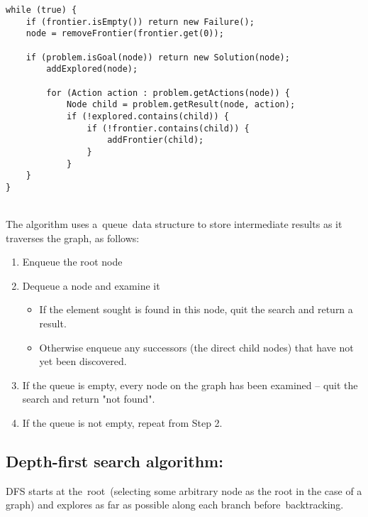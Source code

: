 \documentclass[a4paper]{article}
\begin{document}
\begin{lstlisting}
while (true) {
    if (frontier.isEmpty()) return new Failure();
    node = removeFrontier(frontier.get(0));

    if (problem.isGoal(node)) return new Solution(node);
        addExplored(node);

        for (Action action : problem.getActions(node)) {
            Node child = problem.getResult(node, action);
            if (!explored.contains(child)) {
                if (!frontier.contains(child)) {
                    addFrontier(child);
                }
            }
    }
}
\end{lstlisting}

\noindent \\
The algorithm uses a queue data structure to store intermediate results as it traverses the graph, as follows:\\

\begin{enumerate}
\item Enqueue the root node
\item Dequeue a node and examine it
	\begin{itemize}
		\item If the element sought is found in this node, quit the search and return a result.
		\item Otherwise enqueue any successors (the direct child nodes) that have not yet been discovered.
	\end{itemize}
\item If the queue is empty, every node on the graph has been examined – quit the search and return "not found". \\
\item If the queue is not empty, repeat from Step 2.
\end{enumerate}


\subsection{Depth-first search algorithm:}

DFS starts at the root (selecting some arbitrary node as the root in the case of a graph) and explores as far as possible along each branch before backtracking.
\end{document}
